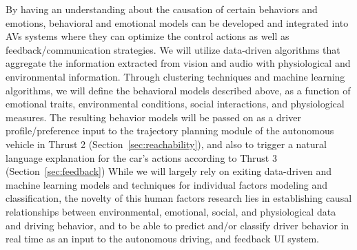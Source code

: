 By having an understanding about the causation of certain behaviors and emotions, behavioral and emotional models can be developed and integrated into AVs systems where they can optimize the control actions as well as feedback/communication strategies.
We will utilize data-driven algorithms that aggregate the information extracted from vision and audio with physiological and environmental information. Through clustering techniques and machine learning algorithms, we will define the behavioral models described above, as a function of emotional traits, environmental conditions, social interactions, and physiological measures.
The resulting behavior models will be passed on as a driver profile/preference input to the trajectory planning module of the autonomous vehicle in Thrust 2 (Section~\ref{sec:reachability}), and also to trigger a natural language explanation for the car's actions according to Thrust 3 (Section~\ref{sec:feedback})
While we will largely rely on exiting data-driven and machine learning models and techniques for individual factors modeling and classification, the novelty of this human factors research lies in establishing causal relationships between environmental, emotional, social, and physiological data and driving behavior, and to be able to predict and/or classify driver behavior in real time as an input to the autonomous driving, and feedback UI system.




 

 
 


